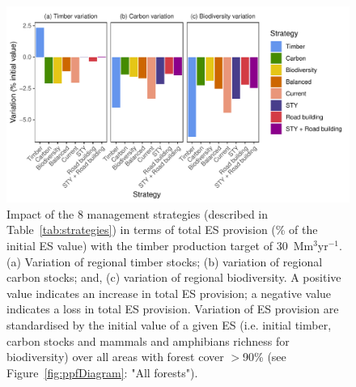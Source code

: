 \documentclass{article}
\begin{document}
\begin{figure}
    \centering
    \includegraphics[width=\linewidth]{graphs/costsScenario}
    \caption{Impact of the 8 management strategies (described in Table~\ref{tab:strategies}) in terms of total ES provision (\% of the initial ES value) with the timber production target of 30~Mm$^3$yr$^{-1}$. (a) Variation of regional timber stocks; (b) variation of regional carbon stocks; and, (c) variation of regional biodiversity. A positive value indicates an increase in total ES provision; a negative value indicates a loss in total ES provision. Variation of ES provision are standardised by the initial value of a given ES (i.e. initial timber, carbon stocks and mammals and amphibians richness for biodiversity) over all areas with forest cover $>$90\% (see Figure~\ref{fig:ppfDiagram}: "All forests"). 
 }
    \label{fig:scenESProv}
\end{figure}
\end{document}
